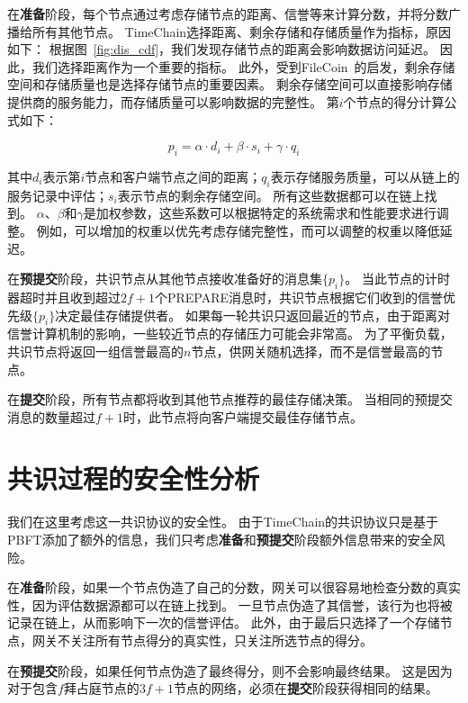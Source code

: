 在\textbf{准备}阶段，每个节点通过考虑存储节点的距离、信誉等来计算分数，并将分数广播给所有其他节点。
TimeChain选择距离、剩余存储和存储质量作为指标，原因如下：
根据图~\autoref{fig:dis_cdf}，我们发现存储节点的距离会影响数据访问延迟。
因此，我们选择距离作为一个重要的指标。
此外，受到FileCoin~\cite{bauer2022filecoin}的启发，剩余存储空间和存储质量也是选择存储节点的重要因素。
剩余存储空间可以直接影响存储提供商的服务能力，而存储质量可以影响数据的完整性。
第$i$个节点的得分计算公式如下：

\begin{equation} 
    \label{eq:score}
    p_i=\alpha\cdot d_i+\beta\cdot s_i+\gamma\cdot q_i
\end{equation}

其中$d_i$表示第$i$节点和客户端节点之间的距离；$q_i$表示存储服务质量，可以从链上的服务记录中评估；$s_i$表示节点的剩余存储空间。
所有这些数据都可以在链上找到。
$\alpha$、$\beta$和$\gamma$是加权参数，这些系数可以根据特定的系统需求和性能要求进行调整。
例如，可以增加的权重以优先考虑存储完整性，而可以调整的权重以降低延迟。

在\textbf{预提交}阶段，共识节点从其他节点接收准备好的消息集$\{p_i\}$。
当此节点的计时器超时并且收到超过$2f+1$个PREPARE消息时，共识节点根据它们收到的信誉优先级$\{p_i\}$决定最佳存储提供者。
如果每一轮共识只返回最近的节点，由于距离对信誉计算机制的影响，一些较近节点的存储压力可能会非常高。
为了平衡负载，共识节点将返回一组信誉最高的$n$节点，供网关随机选择，而不是信誉最高的节点。

在\textbf{提交}阶段，所有节点都将收到其他节点推荐的最佳存储决策。
当相同的预提交消息的数量超过$f+1$时，此节点将向客户端提交最佳存储节点。

\section{共识过程的安全性分析}
我们在这里考虑这一共识协议的安全性。
由于TimeChain的共识协议只是基于PBFT添加了额外的信息，我们只考虑\textbf{准备}和\textbf{预提交}阶段额外信息带来的安全风险。

在\textbf{准备}阶段，如果一个节点伪造了自己的分数，网关可以很容易地检查分数的真实性，因为评估数据源都可以在链上找到。
一旦节点伪造了其信誉，该行为也将被记录在链上，从而影响下一次的信誉评估。
此外，由于最后只选择了一个存储节点，网关不关注所有节点得分的真实性，只关注所选节点的得分。

在\textbf{预提交}阶段，如果任何节点伪造了最终得分，则不会影响最终结果。
这是因为对于包含$f$拜占庭节点的$3f+1$节点的网络，必须在\textbf{提交}阶段获得相同的结果。

